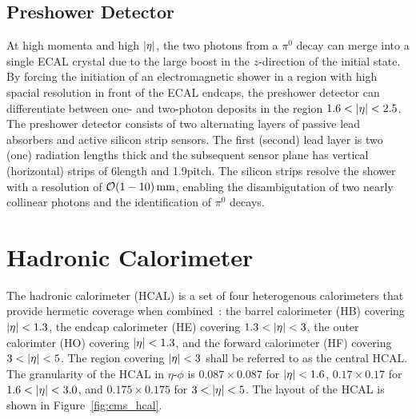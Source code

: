 \subsection{Preshower Detector}

At high momenta and high $\lvert \eta \rvert$, the two photons from a $\pi^0$ decay can merge into a single ECAL crystal due to the large boost in the $z$-direction of the initial state.
By forcing the initiation of an electromagnetic shower in a region with high spacial resolution in front of the ECAL endcaps, the preshower detector can differentiate between one- and two-photon deposits in the region $1.6 < \lvert \eta \rvert < 2.5$.
The preshower detector consists of two alternating layers of passive lead absorbers and active silicon strip sensors.
The first (second) lead layer is two (one) radiation lengths thick and the subsequent sensor plane has vertical (horizontal) strips of 6\cm length and 1.9\mm pitch.
The silicon strips resolve the shower with a resolution of $\mathcal{O}(1-10)\,\text{mm}$, enabling the disambigutation of two nearly collinear photons and the identification of $\pi^0$ decays.

\section{Hadronic Calorimeter}

The hadronic calorimeter (HCAL) is a set of four heterogenous calorimeters that provide hermetic coverage when combined~\cite{CMS2008}: the barrel calorimeter (HB) covering $\lvert \eta \rvert< 1.3$, the endcap calorimeter (HE) covering $1.3 < \lvert \eta \rvert < 3$, the outer calorimter (HO) covering $\lvert \eta \rvert < 1.3$, and the forward calorimeter (HF) covering $3 < \lvert \eta \rvert < 5$.
The region covering $\lvert \eta \rvert < 3$ shall be referred to as the central HCAL.
The granularity of the HCAL in $\eta$-$\phi$ is $0.087\times0.087$ for $\lvert \eta \rvert<1.6$, $0.17\times0.17$ for $1.6 < \lvert \eta \rvert < 3.0$, and $0.175\times0.175$ for $3 < \lvert \eta \rvert < 5$.
The layout of the HCAL is shown in Figure~\ref{fig:cms_hcal}. 

